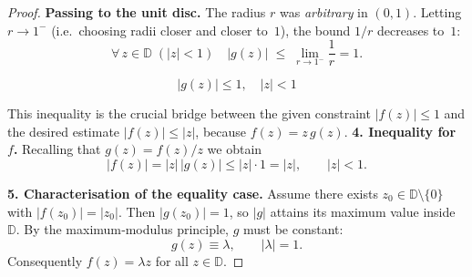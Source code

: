 \documentclass[12pt]{article}
\theoremstyle{definition} %
\theoremstyle{plain} %
\begin{document}
\begin{proof}
\medskip
\textbf{Passing to the unit disc.}  
The radius $r$ was \emph{arbitrary} in $(0,1)$.
Letting $r\to 1^{-}$ (i.e.\ choosing radii closer and closer to~$1$),
the bound $1/r$ decreases to $1$:
\[
   \forall\,z\in\mathbb{D}\; (|z|<1)\quad
   |g(z)|
   \;\le\;
   \lim_{r\to 1^-} \frac{1}{r}
   = 1.
\]

\[
   \boxed{\;|g(z)|\le 1,\quad |z|<1\;}
\]

\noindent
This inequality is the crucial bridge between the given constraint
$|f(z)|\le 1$ and the desired estimate $|f(z)|\le |z|$, because
$f(z)=z\,g(z)$.
      \textbf{4.  Inequality for $f$.}
      Recalling that $g(z)=f(z)/z$ we obtain
      \[
         |f(z)|
         =|z|\,|g(z)|
         \le |z|\cdot 1
         = |z|,
         \qquad |z|<1.
      \]
      
      \medskip
      \textbf{5.  Characterisation of the equality case.}
      Assume there exists $z_0\in\mathbb{D}\setminus\{0\}$ with
      $|f(z_0)|=|z_0|$.  Then $|g(z_0)|=1$, so $|g|$ attains its maximum
      value inside $\mathbb{D}$.  By the maximum‑modulus principle, $g$ must
      be constant:
      \[
         g(z)\equiv\lambda,
         \qquad |\lambda|=1.
      \]
      Consequently $f(z)=\lambda z$ for all $z\in\mathbb{D}$.
      
      \end{proof}
\pagebreak
\end{document}
